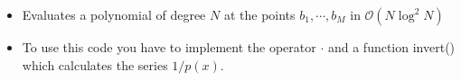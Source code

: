 \begin{itemize}
  \item Evaluates a polynomial of degree $N$ at the points $b_1, \cdots, b_M$ in $\mathcal{O}(N\log^2N)$
  \item To use this code you have to implement the operator $\cdot$ and a function invert() which calculates the series $1 / p(x)$.
\end{itemize}